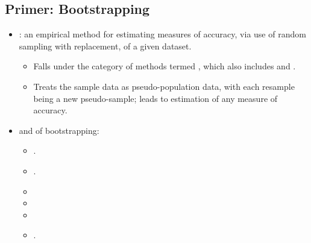 \begin{itemize}
\begin{itemize}
  \end{itemize}

  \subsection{Primer: Bootstrapping}
  \begin{itemize}
    \item {}: an empirical method for estimating measures of accuracy, via use of random sampling with replacement, of a given dataset.
      \begin{itemize}
        \item Falls under the category of methods termed , which also includes \hyperref[Subsection: Primer: Cross-Validation]{} and \hyperref[Subsection: Primer: Permutation Testing]{}. 
        \item Treats the sample data as pseudo-population data, with each resample being a new pseudo-sample; leads to estimation of any measure of accuracy.
      \end{itemize}
    \item {} and  of bootstrapping:
    \begin{multicols}{2}
      \begin{itemize}
        \item {}.
        \item {}.
        \item {}
        \item {}
        \item {}
        \item {}.
      \end{itemize}
    \end{multicols}
  \end{itemize}


\end{itemize}
